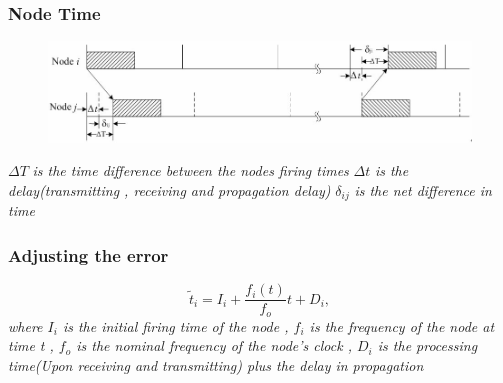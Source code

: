 \documentclass[t]{beamer}
\begin{document}
\begin{frame}
    \frametitle{Node Time}
    \begin{figure}
     \includegraphics[width=0.8 \textwidth]{node_time}
    \end{figure}
        $\Delta T$ \textit{is the time difference between the nodes firing
        times}
    \newline
    $\Delta t$ \textit{is the delay(transmitting , receiving and propagation
    delay)} \newline
    $\delta_{ij}$ \textit{is the net difference in time}
\end{frame}
\begin{frame}
    \frametitle{Adjusting the error}
    \begin{equation}
         \tilde t_{i} = I_i + \frac{f_i(t)}{f_o}t + D_i  ,
    \end{equation}
    \newline
    \textit{
where \newline
 $I_i$ is the initial firing time of the node ,\newline
 $f_i$ is the frequency of the node at time t ,\newline
 $f_o$ is the nominal frequency of the node's clock , \newline
 $D_i$ is the processing time(Upon receiving and transmitting) plus the delay in propagation}
\end{frame}
\end{document}
